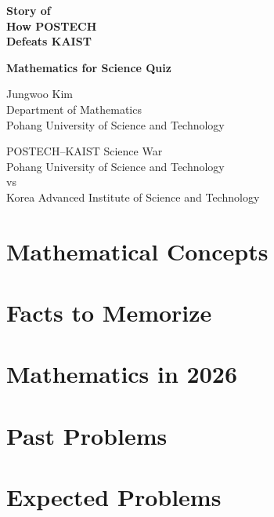 \documentclass[11pt,oneside]{book}
\theoremstyle{breakdefinition}
\theoremstyle{breakplain}
\theoremstyle{breakplain}
\theoremstyle{breakdefinition}
\theoremstyle{sameline}
\begin{document}
    \begin{titlepage}
        \centering

        \vspace*{2.4cm}

        {\Huge\bfseries Story of\\[0.35em]
        How \textcolor{postechred}{POSTECH}\\[0.35em]
        Defeats \textcolor{kaistblue}{KAIST}\par}

        \vspace{0.7cm}

        {\LARGE\bfseries Mathematics for Science Quiz\par}

        \vspace{1.6cm}

        {\large
        Jungwoo Kim\\
        Department of Mathematics\\
        \textcolor{postechred}{Pohang University of Science and Technology}
        \par}

        \vfill

        {\large
        \textcolor{postechred}{POSTECH}--\textcolor{kaistblue}{KAIST} Science War\\[0.7em]
        \textcolor{postechred}{Pohang University of Science and Technology}\\
        vs\\
        \textcolor{kaistblue}{Korea Advanced Institute of Science and Technology}
        \par}

        \vspace{0.3cm}

    \end{titlepage}

    

    \tableofcontents

    

    \part{Mathematical Concepts}

    

    \part{Facts to Memorize}

    

    \part{Mathematics in 2026}

    

    \part{Past Problems}

    

    \part{Expected Problems}

    
\end{document}

